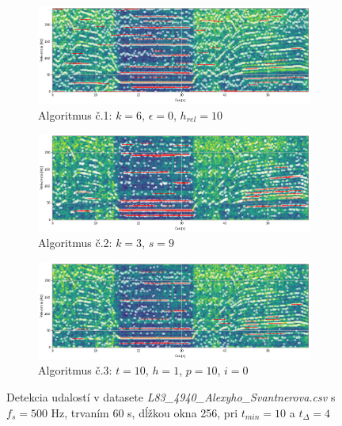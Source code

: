 \begin{figure}[h]
	\centering
     \begin{subfigure}{\textwidth}
        \centering
     	\includegraphics[width=\textwidth]{figures/verification/L83-dataset-A1.png}
     	\caption{Algoritmus č.1: $k = 6$, $\epsilon = 0$, $h_{rel} = 10$}
     \end{subfigure}
     \begin{subfigure}{\textwidth}
    	\centering
        \includegraphics[width=\textwidth]{figures/verification/L83-dataset-A2.png}
        \caption{Algoritmus č.2: $k = 3$, $s = 9$}
     \end{subfigure}
      \begin{subfigure}{\textwidth}
    	\centering
        \includegraphics[width=\textwidth]{figures/verification/L83-dataset-A3.png}
        \caption{Algoritmus č.3: $t = 10$, $h = 1$, $p = 10$, $i = 0$}
     \end{subfigure}
     \caption{Detekcia udalostí v datasete \emph{L83\_4940\_Alexyho\_Svantnerova.csv} s $f_s = 500$ Hz, trvaním 60 s, dĺžkou okna 256,
     pri $t_{min} = 10$ a $t_{\Delta} = 4$}
     \label{dataset-detection}
\end{figure}
\cleardoublepage
